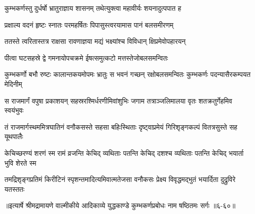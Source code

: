 \twolineshloka
{कुम्भकर्णस्तु दुर्धर्षो भ्रातुराज्ञाय शासनम्}
{तथेत्युक्त्वा महावीर्यः शयनादुत्पपात ह} %

\twolineshloka
{प्रक्षाल्य वदनं हृष्टः स्नातः परमहर्षितः}
{पिपासुस्त्वरयामास पानं बलसमीरणम्} %

\twolineshloka
{ततस्ते त्वरितास्तत्र राक्षसा रावणाज्ञया}
{मद्यं भक्ष्यांश्च विविधान् क्षिप्रमेवोपहारयन्} %

\twolineshloka
{पीत्वा घटसहस्रे द्वे गमनायोपचक्रमे}
{ईषत्समुत्कटो मत्तस्तेजोबलसमन्वितः} %

\threelineshloka
{कुम्भकर्णो बभौ रुष्टः कालान्तकयमोपमः}
{भ्रातुः स भवनं गच्छन् रक्षोबलसमन्वितः}
{कुम्भकर्णः पदन्यासैरकम्पयत मेदिनीम्} %

\twolineshloka
{स राजमार्गं वपुषा प्रकाशयन् सहस्ररश्मिर्धरणीमिवांशुभिः}
{जगाम तत्राञ्जलिमालया वृतः शतक्रतुर्गेहमिव स्वयंभुवः} %

\twolineshloka
{तं राजमार्गस्थममित्रघातिनं वनौकसस्ते सहसा बहिःस्थिताः}
{दृष्ट्वाप्रमेयं गिरिशृङ्गकल्पं वितत्रसुस्ते सह यूथपालैः} %

\twolineshloka
{केचिच्छरण्यं शरणं स्म रामं व्रजन्ति केचिद् व्यथिताः पतन्ति}
{केचिद् दशश्च व्यथिताः पतन्ति केचिद् भयार्ता भुवि शेरते स्म} %

\twolineshloka
{तमद्रिशृङ्गप्रतिमं किरीटिनं स्पृशन्तमादित्यमिवात्मतेजसा}
{वनौकसः प्रेक्ष्य विवृद्धमद्भुतं भयार्दिता दुद्रुविरे यतस्ततः} %


॥इत्यार्षे श्रीमद्रामायणे वाल्मीकीये आदिकाव्ये युद्धकाण्डे कुम्भकर्णप्रबोधः नाम षष्ठितमः सर्गः ॥६-६०॥
